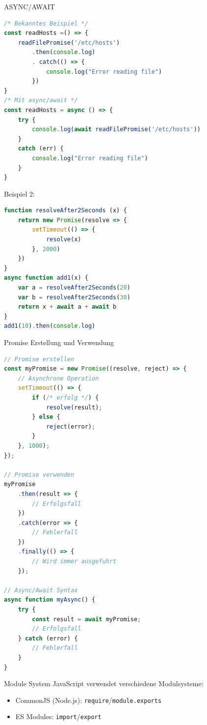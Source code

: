 \begin{code}{ASYNC/AWAIT}
\begin{lstlisting}[language=JavaScript, style=basesmol]
/* Bekanntes Beispiel */
const readHosts =() => {
    readFilePromise('/etc/hosts')
        .then(console.log)
        . catch(() => {
            console.log("Error reading file")
        })
}
/* Mit async/await */
const readHosts = async () => {
    try {
        console.log(await readFilePromise('/etc/hosts'))
    }
    catch (err) {
        console.log("Error reading file")
    }
}
\end{lstlisting}
Beispiel 2:
\begin{lstlisting}[language=JavaScript, style=basesmol]
function resolveAfter2Seconds (x) {
    return new Promise(resolve => {
        setTimeout(() => {
            resolve(x)
        }, 2000)
    })
}
async function add1(x) {
    var a = resolveAfter2Seconds(20)
    var b = resolveAfter2Seconds(30)
    return x + await a + await b
}
add1(10).then(console.log)
\end{lstlisting}
\end{code}

\begin{KR}{Promise Erstellung und Verwendung}
\begin{lstlisting}[language=JavaScript, style=basesmol]
// Promise erstellen
const myPromise = new Promise((resolve, reject) => {
    // Asynchrone Operation
    setTimeout(() => {
        if (/* erfolg */) {
            resolve(result);
        } else {
            reject(error);
        }
    }, 1000);
});

// Promise verwenden
myPromise
    .then(result => {
        // Erfolgsfall
    })
    .catch(error => {
        // Fehlerfall
    })
    .finally(() => {
        // Wird immer ausgefuhrt
    });

// Async/Await Syntax
async function myAsync() {
    try {
        const result = await myPromise;
        // Erfolgsfall
    } catch (error) {
        // Fehlerfall
    }
}
\end{lstlisting}
\end{KR}

\begin{concept}{Module System}
    JavaScript verwendet verschiedene Modulsysteme:
    \begin{itemize}
        \item CommonJS (Node.js): \texttt{require}/\texttt{module.exports}
        \item ES Modules: \texttt{import}/\texttt{export}
    \end{itemize}
\end{concept}

